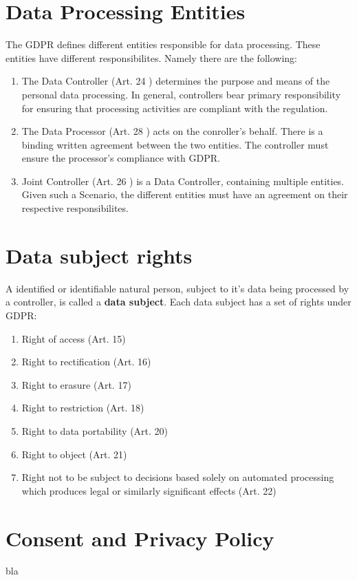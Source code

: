 \documentclass[a4paper,12pt]{report}
\begin{document}
	\section{Data Processing Entities}
	\startsection
	The GDPR defines different entities responsible for data processing. These entities have different responsibilites.
	Namely there are the following:
	\begin{enumerate}[]
		\item The Data Controller (Art. 24 \cite{EUdataregulations2018})
		determines the purpose and means of the personal data processing.
		In general, controllers bear primary responsibility for ensuring that processing activities are compliant with the regulation.
		\item The Data Processor (Art. 28 \cite{EUdataregulations2018})
		acts on the conroller's behalf. 
		There is a binding written agreement between the two entities. 
		The controller must ensure the processor's compliance with GDPR.
		\item Joint Controller (Art. 26 \cite{EUdataregulations2018}) is a Data Controller, containing multiple entities.
		Given such a Scenario, the different entities must have an agreement on their respective responsibilites.
	\end{enumerate}
	\closesection

	\section{Data subject rights}
	\startsection
	A identified or identifiable natural person, subject to it's data being processed by a controller, is called a \textbf{data subject}.
	Each data subject has a set of rights under GDPR:
	\begin{enumerate}[]
		\item Right of access (Art. 15)
		\item Right to rectification (Art. 16)
		\item Right to erasure (Art. 17)
		\item Right to restriction (Art. 18)
		\item Right to data portability (Art. 20)
		\item Right to object (Art. 21)
		\item Right not to be subject to decisions based solely on automated processing which produces legal or similarly significant effects (Art. 22)
	\end{enumerate}
	\closesection

	\section{Consent and Privacy Policy}
	\startsection
	bla
	\closesection
\end{document}
